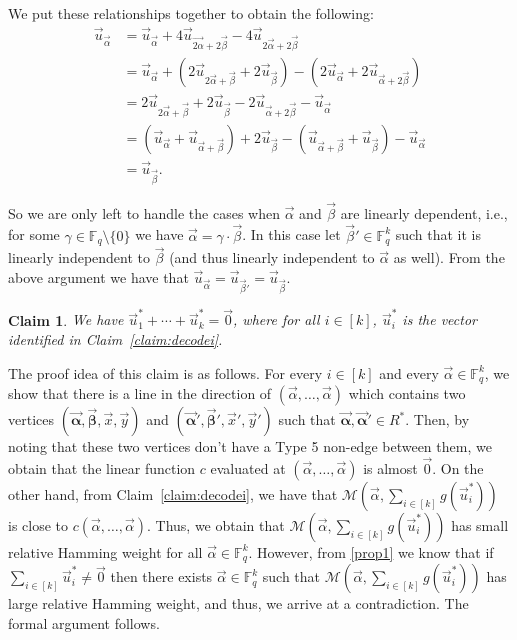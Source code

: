 \documentclass[10pt,a4paper]{article}
\newcommand{\F}{\mathbb{F}}
\newtheorem{claim}[theorem]{Claim}
\newcommand{\alphab}{\vec{\bm{\alpha}}}
\newcommand{\betab}{\vec{\bm{\beta}}}
\newcommand{\M}{\mathcal{M}}
\begin{document}
We put these relationships together to obtain the following:
\begin{align*}
\vec{u}_{\vec{\alpha}}&=\vec{u}_{\vec{\alpha}}+4\vec{u}_{\vec{2\alpha}+2\vec{\beta}}-4\vec{u}_{2\vec{\alpha}+2\vec{\beta}}\\
&=\vec{u}_{\vec{\alpha}}+\left(2\vec{u}_{2\vec{\alpha}+\vec{\beta}}+2\vec{u}_{\vec{\beta}}\right)-\left(2\vec{u}_{\vec{\alpha}}+2\vec{u}_{\vec{\alpha}+2\vec{\beta}}\right)\\
&=2\vec{u}_{2\vec{\alpha}+\vec{\beta}}+2\vec{u}_{\vec{\beta}}-2\vec{u}_{\vec{\alpha}+2\vec{\beta}}-\vec{u}_{\vec{\alpha}}\\
&=\left(\vec{u}_{\vec{\alpha}}+\vec{u}_{\vec{\alpha}+\vec{\beta}}\right)+2\vec{u}_{\vec{\beta}}-\left(\vec{u}_{\vec{\alpha}+\vec{\beta}}+\vec{u}_{\vec{\beta}}\right)-\vec{u}_{\vec{\alpha}}\\
&=\vec{u}_{\vec{\beta}}.
\end{align*}

So we are only left to handle the cases when $\vec{\alpha}$ and $\vec{\beta}$ are linearly dependent, i.e., for some $\gamma\in \F_q\setminus \{0\}$ we have $\vec{\alpha}=\gamma\cdot \vec{\beta}$. In this case let $\vec{\beta}'\in \F_q^k$  such that it is linearly independent to $\vec{\beta}$ (and thus linearly independent to $\vec{\alpha}$ as well). From the above argument we have that $\vec{u}_{\vec{\alpha}}=\vec{u}_{\vec{\beta}'}=\vec{u}_{\vec{\beta}}$.


\begin{claim}\label{claim:testzero}
We have $\vec{u}_1^\ast+\cdots +\vec{u}_k^\ast=\vec{0}$, where for all $i\in[k]$, $\vec{u}_i^\ast$ is the vector identified in Claim~\ref{claim:decodei}. 
\end{claim}

The proof idea of this claim is as follows. For every $i\in[k]$ and every $\vec{\alpha}\in \F_q^k$, we show that there is a line in the direction of $(\vec{\alpha},\ldots ,\vec{\alpha})$ which contains two vertices $(\alphab,\betab,\vec{x},\vec{y})$ and  $(\alphab',\betab',\vec{x}',\vec{y}')$ such that  $\alphab,\alphab'\in R^\ast$. Then, by noting that these two vertices don't have a Type 5 non-edge between them, we obtain that the linear function $c$ evaluated at $(\vec{\alpha},\ldots ,\vec{\alpha})$ is almost $\vec{0}$. On the other hand, from Claim~\ref{claim:decodei}, we have that $\M\left(\vec{\alpha},\underset{i\in[k]}{\sum}g(\vec{u}_i^\ast)\right)$ is close to $c(\vec{\alpha},\ldots ,\vec{\alpha})$. Thus, we obtain that $\M\left(\vec{\alpha},\underset{i\in[k]}{\sum}g(\vec{u}_i^\ast)\right)$ has small relative Hamming weight for all $\vec{\alpha}\in \F_q^k$. However, from  \eqref{prop1} we know that if $\underset{i\in[k]}{\sum}\vec{u}_i^\ast\neq \vec{0}$ then there exists $\vec{\alpha}\in\F_q^k$ such that  $\M\left(\vec{\alpha},\underset{i\in[k]}{\sum}g(\vec{u}_i^\ast)\right)$ has large relative Hamming weight, and thus, we arrive at a contradiction. The formal argument follows.
\end{document}
